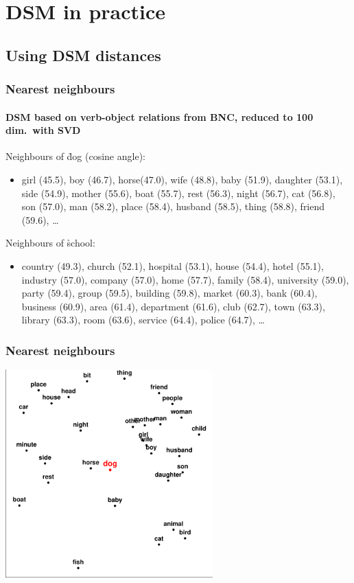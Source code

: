 \section{DSM in practice}

\subsection{Using DSM distances}

\begin{frame}
  \frametitle{Nearest neighbours}
  \framesubtitle{DSM based on verb-object relations from BNC, reduced to 100 dim.\ with SVD}

  Neighbours of \h{dog} (cosine angle):
  \begin{itemize}\item[\hand]
    girl (45.5), boy (46.7), horse(47.0), wife (48.8), baby (51.9),
    daughter (53.1), side (54.9), mother (55.6), boat (55.7),
    rest (56.3), night (56.7), cat (56.8), son (57.0), man (58.2), 
    place (58.4), husband (58.5), thing (58.8), friend (59.6), \ldots
  \end{itemize}

  \gap
  Neighbours of \h{school}:
  \begin{itemize}\item[\hand]
    country (49.3), church (52.1), hospital (53.1), house (54.4),
    hotel (55.1), industry (57.0), company (57.0), home (57.7), family
    (58.4), university (59.0), party (59.4), group (59.5), building
    (59.8), market (60.3), bank (60.4), business (60.9), area (61.4),
    department (61.6), club (62.7), town (63.3), library (63.3), 
    room (63.6), service (64.4), police (64.7), \ldots
  \end{itemize}
\end{frame}

\begin{frame}[c]
  \frametitle{Nearest neighbours}

  \ungap[1]
  \begin{center}
    \includegraphics[width=8cm]{img/neighbourhood_dog}
  \end{center}
\end{frame}

